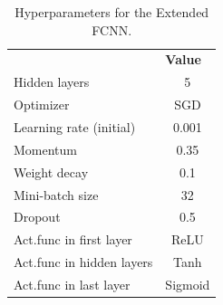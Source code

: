 \documentclass[a4paper, UKenglish, 11pt]{uiomaster}
\begin{document}
\begin{table}
\centering
\begin{tabular}{|lc|}
\hline
\rowcolor[HTML]{CBCEFB}
\multicolumn{2}{|c|}{\cellcolor[HTML]{CBCEFB}{\color[HTML]{000000} \textbf{Extended FCNN}}}    \\ \hline
\rowcolor[HTML]{EFEFEF}
\multicolumn{1}{|l|}{\cellcolor[HTML]{EFEFEF}\textbf{Hyperparameters}} & \multicolumn{1}{l|}{\cellcolor[HTML]{EFEFEF}\textbf{Value}} \\ \hline
\multicolumn{1}{|l|}{Hidden layers}                                    & 5                                                           \\ \hline
\multicolumn{1}{|l|}{Optimizer}                                        & SGD                                                         \\ \hline
\multicolumn{1}{|l|}{Learning rate (initial)}                          & 0.001                                                       \\ \hline
\multicolumn{1}{|l|}{Momentum}                                         & 0.35                                                        \\ \hline
\multicolumn{1}{|l|}{Weight decay}                                     & 0.1                                                         \\ \hline
\multicolumn{1}{|l|}{Mini-batch size}                                   & 32                                                          \\ \hline
\multicolumn{1}{|l|}{Dropout}                                          & 0.5                                                         \\ \hline
\multicolumn{1}{|l|}{Act.func in first layer}                           & ReLU                                                        \\ \hline
\multicolumn{1}{|l|}{Act.func in hidden layers}                         & Tanh                                                        \\ \hline
\multicolumn{1}{|l|}{Act.func in last layer}                           & Sigmoid                                                        \\ \hline
\end{tabular}
\caption{Hyperparameters for the Extended FCNN.}
\label{tab:parameters}
\end{table}


\end{document}
